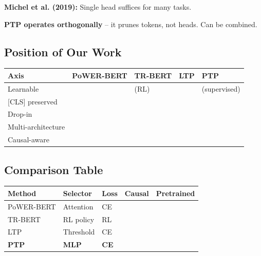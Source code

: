 \textbf{Michel et al. (2019):} Single head suffices for many tasks.

\textbf{PTP operates orthogonally} -- it prunes tokens, not heads. Can be combined.

\subsection{Position of Our Work}

\begin{table}[H]
\centering
\small
\begin{tabular}{lllll}
\toprule
\textbf{Axis} & \textbf{PoWER-BERT} & \textbf{TR-BERT} & \textbf{LTP} & \textbf{PTP} \\
\midrule
Learnable &  & (RL) &  & (supervised) \\
{} [CLS] preserved &  &  &  &  \\
Drop-in &  &  &  &  \\
Multi-architecture &  &  &  &  \\
Causal-aware &  &  &  &  \\
\bottomrule
\end{tabular}
\end{table}

\subsection{Comparison Table}

\begin{table}[H]
\centering
\small
\begin{tabular}{lllll}
\toprule
\textbf{Method} & \textbf{Selector} & \textbf{Loss} & \textbf{Causal} & \textbf{Pretrained} \\
\midrule
PoWER-BERT & Attention & CE &  &  \\
TR-BERT & RL policy & RL &  &  \\
LTP & Threshold & CE &  &  \\
\textbf{PTP} & \textbf{MLP} & \textbf{CE} & \textbf{ } & \textbf{ } \\
\bottomrule
\end{tabular}
\end{table}

